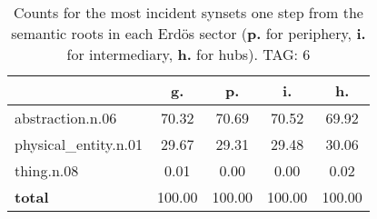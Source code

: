 \begin{table}[h!]
\begin{center}
\begin{tabular}{| l || c | c | c | c |}\hline
 & {\bf g.} & {\bf p.} & {\bf i.} & {\bf h.} \\\hline\hline
abstraction.n.06 & 70.32  & 70.69  & 70.52  & 69.92 \\\hline
physical\_entity.n.01 & 29.67  & 29.31  & 29.48  & 30.06 \\\hline
thing.n.08 & 0.01  & 0.00  & 0.00  & 0.02 \\\hline\hline
{{\bf total}} & 100.00  & 100.00  & 100.00  & 100.00 \\\hline
\end{tabular}
\caption{Counts for the most incident synsets one step from the semantic roots in each Erd\"os sector ({\bf p.} for periphery, {\bf i.} for intermediary, {\bf h.} for hubs). TAG: 6}
\end{center}
\end{table}